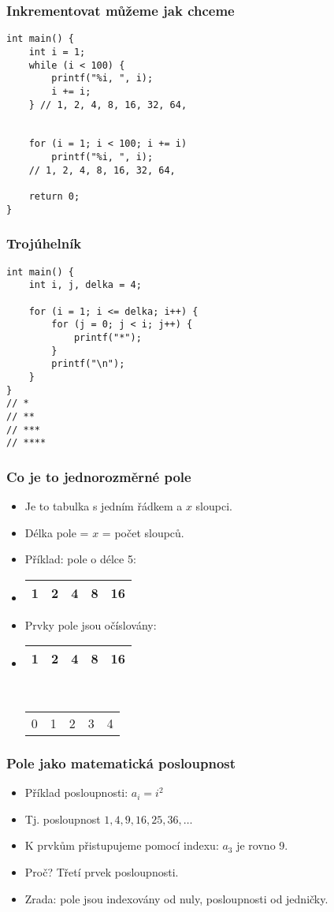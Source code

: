 \documentclass{beamer}
\newenvironment{itemizex}%
  {\large \begin{itemize}%
    \setlength{\itemsep}{8pt}%
    \setlength{\parskip}{8pt}}%
  {\end{itemize}}
\begin{document}
\begin{frame}[t,fragile]\frametitle{Inkrementovat můžeme jak chceme} 
\begin{verbatim} 
int main() {
    int i = 1;
    while (i < 100) {
        printf("%i, ", i);
        i += i;
    } // 1, 2, 4, 8, 16, 32, 64, 


    for (i = 1; i < 100; i += i)
        printf("%i, ", i);
    // 1, 2, 4, 8, 16, 32, 64, 

    return 0;
}
\end{verbatim}
\end{frame}


\begin{frame}[t,fragile]\frametitle{Trojúhelník} 
\begin{verbatim} 
int main() {
    int i, j, delka = 4;

    for (i = 1; i <= delka; i++) {
        for (j = 0; j < i; j++) {
            printf("*");
        }
        printf("\n");
    }
}
// *
// **
// ***
// ****
\end{verbatim}
\end{frame}


\begin{frame}[t,fragile]\frametitle{Co je to jednorozměrné pole}
\begin{itemizex}
    \item Je to tabulka s jedním řádkem a $x$ sloupci. 
    \item Délka pole = $x$ = počet sloupců.
    \item Příklad: pole o délce 5:
    \item 
\begin{tabular}{|c|c|c|c|c|}
\hline 1& 2 & 4 & 8 &16 \\\hline
\end{tabular}
    \item Prvky pole jsou očíslovány:
    \item 
\begin{tabular}{|c|c|c|c|c|}
\hline 1& 2 & 4 & 8 &16 \\\hline
\end{tabular}\\
\begin{tabular}{ccccc}
 0&1&2&3&4
\end{tabular}
\end{itemizex}

\end{frame}


\begin{frame}[t,fragile]\frametitle{Pole jako matematická posloupnost} 
\begin{itemizex}
    \item Příklad posloupnosti: $a_i = i^2$
    \item Tj. posloupnost $1, 4, 9, 16, 25, 36, \dots$
    \item K prvkům přistupujeme pomocí indexu: $a_3$ je rovno 9. 
    \item Proč? Třetí prvek posloupnosti. 
    \item Zrada: pole jsou indexovány od nuly, posloupnosti od jedničky. 
\end{itemizex}
\end{frame}
\end{document}
